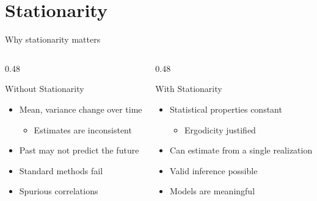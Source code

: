 \documentclass[9pt, aspectratio=169, t]{beamer}
\begin{document}
\section{Stationarity}

\begin{frame}{Why stationarity matters}
    \vspace{-0.2cm}
    \begin{columns}[T]
        \begin{column}{0.48\textwidth}
            \begin{alertblock}{Without Stationarity}
            \begin{itemize}\setlength{\itemsep}{0pt}
                \item Mean, variance change over time
                \begin{itemize}
                    \item Estimates are inconsistent
                \end{itemize}
                \item Past may not predict the future
                \item Standard methods fail
                \item Spurious correlations
            \end{itemize}
            \end{alertblock}
        \end{column}
        \begin{column}{0.48\textwidth}
            \begin{exampleblock}{With Stationarity}
            \begin{itemize}\setlength{\itemsep}{0pt}
                \item Statistical properties constant
                \begin{itemize}
                    \item Ergodicity justified
                \end{itemize}
                \item Can estimate from a single realization
                \item Valid inference possible
                \item Models are meaningful
            \end{itemize}
            \end{exampleblock}
        \end{column}
    \end{columns}


\end{frame}
\end{document}
